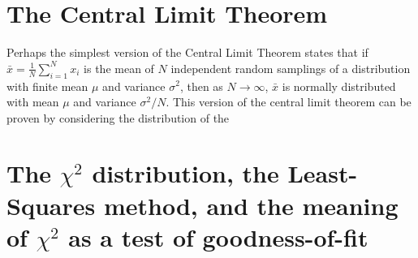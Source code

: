 \documentclass{revtex4}
\begin{document}
\section{The Central Limit Theorem}
Perhaps the simplest version of the Central Limit Theorem states that
if $\bar{x} = \frac{1}{N}\sum_{i=1}^N x_i$ is the mean of $N$
independent random samplings of a distribution with finite mean $\mu$
and variance $\sigma^2$, then as $N \rightarrow \infty$, $\bar{x}$ is
normally distributed with mean $\mu$ and variance $\sigma^2/N$. This
version of the central limit theorem can be proven by considering the
distribution of the 
\section{The $\chi^2$ distribution, the Least-Squares method, and the
  meaning of $\chi^2$ as a test of goodness-of-fit}
\end{document}
